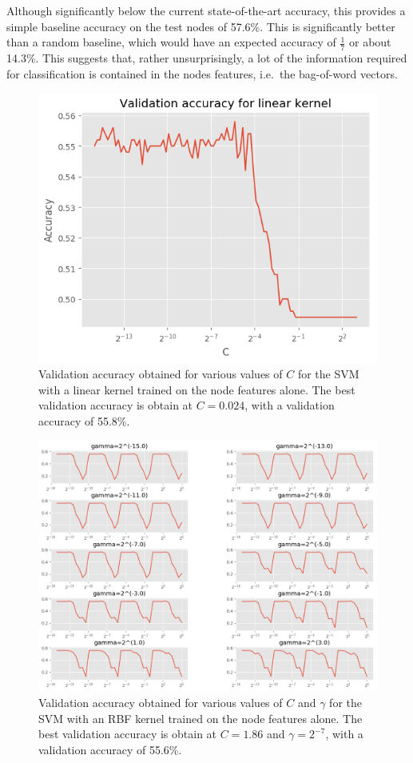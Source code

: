 \documentclass[12pt]{article}
\theoremstyle{definition}
\begin{document}
\bigskip

Although significantly below the current state-of-the-art accuracy, this provides a simple baseline accuracy on the test nodes of 57.6\%. This is significantly better than a random baseline, which would have an expected accuracy of $\frac{1}{7}$ or about 14.3\%. This suggests that, rather unsurprisingly, a lot of the information required for classification is contained in the nodes features, i.e.\ the bag-of-word vectors. 

\begin{figure}[h]
	\includegraphics[width=1.0\textwidth]{node_svm/linear_reg}
	\centering
	\caption{Validation accuracy obtained for various values of $C$ for the SVM with a linear kernel trained on the node features alone. The best validation accuracy is obtain at $C=0.024$, with a validation accuracy of 55.8\%.}
	\label{fig/node_svm_linear_reg}
\end{figure}
\begin{figure}[h]
	\includegraphics[width=1.0\textwidth]{node_svm/rbf_reg}
	\centering
	\caption{Validation accuracy obtained for various values of $C$ and $\gamma$ for the SVM with an RBF kernel trained on the node features alone. The best validation accuracy is obtain at $C=1.86$ and $\gamma=2^{-7}$, with a validation accuracy of 55.6\%.}
	\label{fig/node_svm_rbf_reg}
\end{figure}
\end{document}
